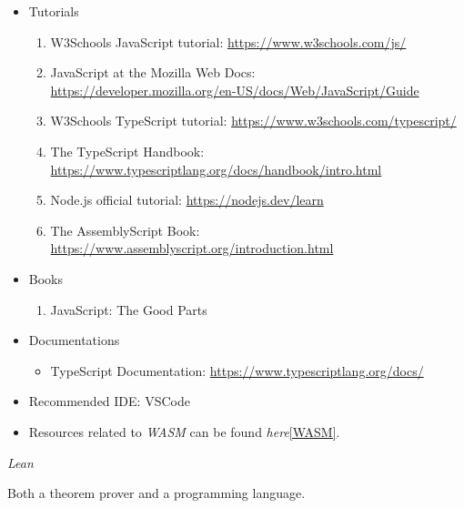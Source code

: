 \documentclass{article}
\begin{document}
\begin{itemize}
    \item Tutorials   
    \begin{enumerate}
        \item W3Schools JavaScript tutorial:
        \href{https://www.w3schools.com/js/}{https://www.w3schools.com/js/}
        \item JavaScript at the Mozilla Web Docs:\\
        \href{https://developer.mozilla.org/en-US/docs/Web/JavaScript/Guide}{https://developer.mozilla.org/en-US/docs/Web/JavaScript/Guide}
        \item W3Schools TypeScript tutorial:
        \href{https://www.w3schools.com/typescript/}{https://www.w3schools.com/typescript/}
        \item The TypeScript Handbook:\\
        \href{https://www.typescriptlang.org/docs/handbook/intro.html}{https://www.typescriptlang.org/docs/handbook/intro.html}
        \item Node.js official tutorial:
        \href{https://nodejs.dev/learn}{https://nodejs.dev/learn}
        \item The AssemblyScript Book:\\
        \href{https://www.assemblyscript.org/introduction.html}{https://www.assemblyscript.org/introduction.html}
    \end{enumerate}
    \item Books
    \begin{enumerate}
        \item JavaScript: The Good Parts
        \cite{crockford2008javascript}
    \end{enumerate}
    \item Documentations
    \begin{itemize}
        \item TypeScript Documentation:
        \href{https://www.typescriptlang.org/docs/}{https://www.typescriptlang.org/docs/}
    \end{itemize}
    \item Recommended IDE: VSCode
    \item Resources related to \emph{WASM} can be found \emph{here}\ref{WASM}.
\end{itemize}

\item \emph{Lean}

Both a theorem prover and a programming language.
\end{document}
